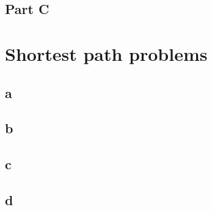 \documentclass[11pt]{scrreprt}
\begin{document}
\section{Part C}

\chapter{Shortest path problems}

\section{a}
\section{b}
\section{c}
\section{d}
\end{document}
